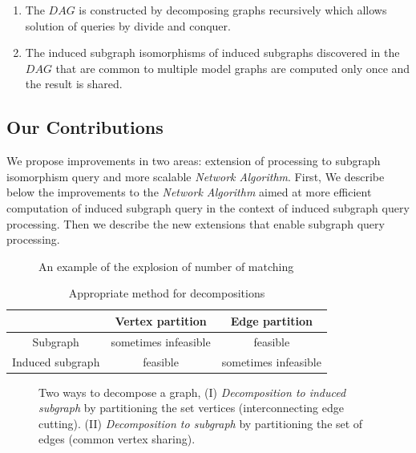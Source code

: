 \begin{enumerate}
\item The $DAG$ is constructed by decomposing graphs recursively which allows solution of queries by divide and conquer.
\item The induced subgraph isomorphisms of induced subgraphs discovered in the $DAG$ that are common to multiple model graphs are computed only once and the result is shared.
\end{enumerate}

\subsection{Our Contributions}

We propose improvements in two areas: extension of processing to subgraph isomorphism query and more scalable \textit{Network Algorithm}. First, We describe below the improvements to the \textit{Network Algorithm} aimed at more efficient computation of induced subgraph query in the context of induced subgraph query processing. Then we describe the new extensions that enable subgraph query processing. 


\begin{figure}
        \centering
        
        \caption{An example of the explosion of number of matching \label{fig:fig3} }
\end{figure}

\begin{table}
\begin{center}\begin{tabular}{|c|c|c|}
\hline
  & Vertex partition  & Edge partition  \\ \hline
Subgraph & sometimes infeasible  & feasible \\ \hline
Induced subgraph & feasible & sometimes  infeasible \\ \hline
\end{tabular}
\caption{Appropriate method for decompositions \label{tab:table1} }
\end{center}
\end{table}

\begin{figure}
\centering

\caption{Two ways to decompose a graph, (I) \textit{Decomposition to induced subgraph} by partitioning the set vertices (interconnecting edge cutting). (II) \textit{Decomposition to subgraph} by partitioning the set of edges (common vertex sharing).}
\label{fig:fig4}
\end{figure}


